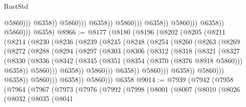 \begin{lexlean}{RustStd}
\begin{coremodule}
                                                    @5860)))
                                              @6358))
                                          @5860)))
                                    @6358))
                                @5860)))
                          @6358))
                      @5860)))
                @6358))
            @5860)))
      @6358)
@8966 := @8177
    (@8180
      (@8196
        (@8202
          (@8205
            (@8211
              (@8214
                (@8230
                  (@8236
                    (@8239
                      (@8245
                        (@8248
                          (@8254
                            (@8260
                              (@8263
                                (@8269
                                  (@8272
                                    (@8288
                                      (@8294
                                        (@8297
                                          (@8303
                                            (@8306
                                              (@8312
                                                (@8318
                                                  (@8321
                                                    (@8327
                                                      (@8330
                                                        (@8336
                                                          (@8342
                                                            (@8345
                                                              (@8351
                                                                (@8354 (@8370 (@8376 @8918 @5860)))
                                                                @6358))
                                                            @5860)))
                                                      @6358))
                                                  @5860)))
                                            @6358))
                                        @5860)))
                                  @6358))
                              @5860)))
                        @6358))
                    @5860)))
              @6358))
          @5860)))
    @6358
@9014 := @7939
    (@7942
      (@7958
        (@7964
          (@7967
            (@7973
              (@7976
                (@7992
                  (@7998
                    (@8001
                      (@8007
                        (@8010
                          (@8026
                            (@8032
                              (@8035
                                (@8041

\end{coremodule}
\end{lexlean}
